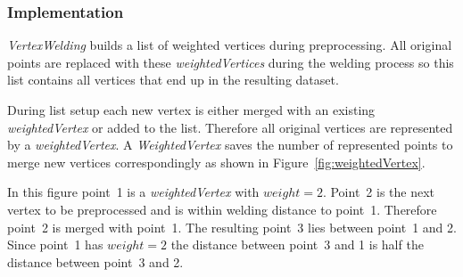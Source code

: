 \documentclass[../ClassicThesis.tex]{subfiles}
\begin{document}










\subsubsection{Implementation}

\emph{VertexWelding} builds a list of weighted vertices during preprocessing. All original points are replaced with these \emph{weightedVertices} during the welding process so this list contains all vertices that end up in the resulting dataset.

During list setup each new vertex is either merged with an existing \emph{weightedVertex} or added to the list. Therefore all original vertices are represented by a \emph{weightedVertex}. A \emph{WeightedVertex} saves the number of represented points to merge new vertices correspondingly as shown in Figure~\ref{fig:weightedVertex}.

In this figure point~1 is a \emph{weightedVertex} with $weight = 2 $. Point~2 is the next vertex to be preprocessed and is within welding distance to point~1. Therefore point~2 is merged with point~1. The resulting point~3 lies between point~1 and 2. Since point~1 has $ weight = 2 $ the distance between point~3 and 1 is half the distance between point~3 and 2.
\end{document}
